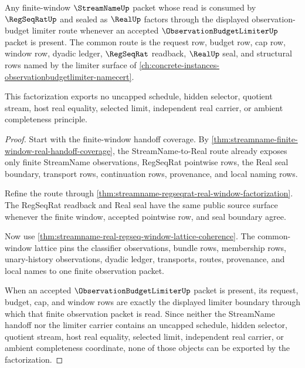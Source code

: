 \begin{theorem}
\label{thm:streamname-real-seal-observation-budget-factorization}
Any finite-window $\StreamNameUp$ packet whose read is consumed by $\RegSeqRatUp$ and sealed as $\RealUp$ factors through the displayed observation-budget limiter route whenever an accepted $\ObservationBudgetLimiterUp$ packet is present. The common route is the request row, budget row, cap row, window row, dyadic ledger, $\RegSeqRat$ readback, $\RealUp$ seal, and structural rows named by the limiter surface of \autoref{ch:concrete-instances-observationbudgetlimiter-namecert}.

This factorization exports no uncapped schedule, hidden selector, quotient stream, host real equality, selected limit, independent real carrier, or ambient completeness principle.
\end{theorem}
\begin{proof}
Start with the finite-window handoff coverage. By \autoref{thm:streamname-finite-window-real-handoff-coverage}, the StreamName-to-Real route already exposes only finite StreamName observations, RegSeqRat pointwise rows, the Real seal boundary, transport rows, continuation rows, provenance, and local naming rows.

Refine the route through \autoref{thm:streamname-regseqrat-real-window-factorization}. The RegSeqRat readback and Real seal have the same public source surface whenever the finite window, accepted pointwise row, and seal boundary agree.

Now use \autoref{thm:streamname-real-regseq-window-lattice-coherence}. The common-window lattice pins the classifier observations, bundle rows, membership rows, unary-history observations, dyadic ledger, transports, routes, provenance, and local names to one finite observation packet.

When an accepted $\ObservationBudgetLimiterUp$ packet is present, its request, budget, cap, and window rows are exactly the displayed limiter boundary through which that finite observation packet is read. Since neither the StreamName handoff nor the limiter carrier contains an uncapped schedule, hidden selector, quotient stream, host real equality, selected limit, independent real carrier, or ambient completeness coordinate, none of those objects can be exported by the factorization.
\end{proof}

